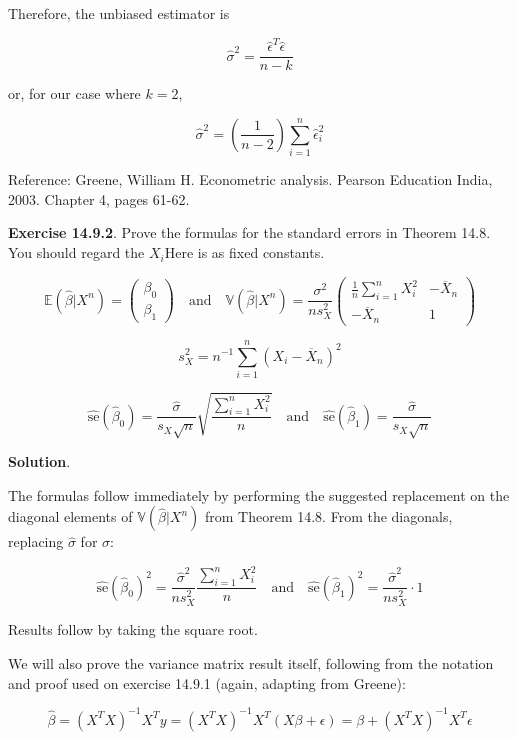 Therefore, the unbiased estimator is

\[\hat{\sigma}^{2} = \frac{\hat{\epsilon}^T \hat{\epsilon}}{n - k}\]

or, for our case where \(k = 2\),

\[\hat{\sigma}^{2} = \left( \frac{1}{n - 2} \right) \sum_{i=1}^{n} \hat{\epsilon}_{i}^{2}\]

Reference: Greene, William H. Econometric analysis. Pearson Education
India, 2003. Chapter 4, pages 61-62.

\textbf{Exercise 14.9.2}. Prove the formulas for the standard errors in
Theorem 14.8. You should regard the \(X_{i}\)Here is as fixed constants.

\[
\mathbb{E}(\hat{\beta} | X^{n}) = \begin{pmatrix}\beta_{0} \\ \beta_{1} \end{pmatrix}
\quad \text{and} \quad
\mathbb{V}(\hat{\beta} | X^{n}) = \frac{\sigma^{2}}{n s_X^{2}} \begin{pmatrix} 
\frac{1}{n} \sum_{i=1}^{n} X_{i}^{2} & -\overline{X}_{n} \\
-\overline{X}_{n} & 1
\end{pmatrix}
\]

\[s_X^{2} = n^{-1} \sum_{i=1}^{n} (X_{i} - \overline{X}_{n})^{2}\]

\[
\hat{\text{se}}(\hat{\beta}_{0}) = \frac{\hat{\sigma}}{s_X \sqrt{n}} \sqrt{\frac{\sum_{i=1}^{n} X_{i}^{2}}{n}}
\quad \text{and} \quad
\hat{\text{se}}(\hat{\beta}_{1}) = \frac{\hat{\sigma}}{s_X \sqrt{n}}
\]

\textbf{Solution}.

The formulas follow immediately by performing the suggested replacement
on the diagonal elements of \(\mathbb{V}(\hat{\beta} | X^{n})\) from
Theorem 14.8. From the diagonals, replacing \(\hat{\sigma}\) for
\(\sigma\):

\[
\hat{\text{se}}(\hat{\beta}_{0})^{2} = \frac{\hat{\sigma}^{2}}{n s_X^{2}} \frac{\sum_{i=1}^{n} X_{i}^{2}}{n}
\quad \text{and} \quad
\hat{\text{se}}(\hat{\beta}_{1})^{2} = \frac{\hat{\sigma}^{2}}{n s_X^{2}} \cdot 1\]

Results follow by taking the square root.

We will also prove the variance matrix result itself, following from the
notation and proof used on exercise 14.9.1 (again, adapting from
Greene):

\[
\hat{\beta} = (X^T X)^{-1}X^T y = (X^T X)^{-1}X^T (X \beta + \epsilon) = \beta + (X^T X)^{-1}X^T \epsilon
\]

